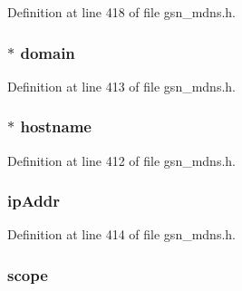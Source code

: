 Definition at line 418 of file gsn\_\-mdns.h.

\hypertarget{a00143_a3498b70cb998dd924ec4aea5780b9696}{
\subsubsection[{domain}]{$\ast$ {\bf domain}}}
\label{a00143_a3498b70cb998dd924ec4aea5780b9696}


Definition at line 413 of file gsn\_\-mdns.h.

\hypertarget{a00143_a45121663692c76af31d59c96115adbd1}{
\subsubsection[{hostname}]{$\ast$ {\bf hostname}}}
\label{a00143_a45121663692c76af31d59c96115adbd1}


Definition at line 412 of file gsn\_\-mdns.h.

\hypertarget{a00143_abff310b1595daac16cd3f35c9c6e95eb}{
\subsubsection[{ipAddr}]{ {\bf ipAddr}}}
\label{a00143_abff310b1595daac16cd3f35c9c6e95eb}


Definition at line 414 of file gsn\_\-mdns.h.

\hypertarget{a00143_aa73cc4a6cdd8178cc27ecbdd515c750c}{
\subsubsection[{scope}]{ {\bf scope}}}
\label{a00143_aa73cc4a6cdd8178cc27ecbdd515c750c}


